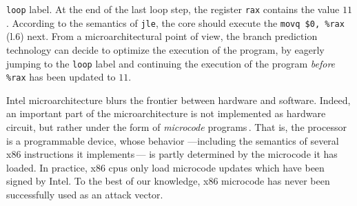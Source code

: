 \texttt{loop} label.
%
At the end of the last loop step, the register \texttt{rax} contains the value
\( 11 \).
%
According to the semantics of \texttt{jle}, the core should execute the
\texttt{movq~\$0,~\%rax} (l.6) next.
%
From a microarchitectural point of view, the branch prediction technology can
decide to optimize the execution of the program, by eagerly jumping to the
\texttt{loop} label and continuing the execution of the program \emph{before}
\texttt{\%rax} has been updated to \( 11 \).
%
%

Intel microarchitecture blurs the frontier between hardware and software.
%
Indeed, an important part of the microarchitecture is not implemented as
hardware circuit, but rather under the form of \emph{microcode}
programs\,\cite[Section 2.14]{costan2016sgxexplained}.
%
That is, the processor is a programmable device, whose behavior ---including the
semantics of several x86 instructions it
implements\,\cite{johnson2015patentsgx}--- is partly determined by the microcode
it has loaded.
%
In practice, x86 \acp{cpu} only load microcode updates which have been signed by
Intel.
%
To the best of our knowledge, x86 microcode has never been successfully used as
an attack vector.

